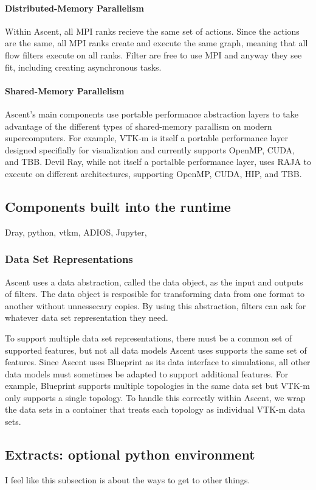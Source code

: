 \paragraph{Distributed-Memory Parallelism}
Within Ascent, all MPI ranks recieve the same set of actions.
%
Since the actions are the same, all MPI ranks create and execute the same graph,
meaning
that all flow filters execute on all ranks.
%
Filter are free to use MPI and anyway they see fit, including
creating asynchronous tasks.

\paragraph{Shared-Memory Parallelism}
Ascent's main components use portable performance abstraction layers to
take advantage of the different types of shared-memory parallism on
modern supercomputers.
%
For example, VTK-m is itself a portable performance layer designed specifially
for visualization and currently supports OpenMP, CUDA, and TBB.
%
Devil Ray, while not itself a portalble performance layer, uses RAJA to execute
on different architectures, supporting OpenMP, CUDA, HIP, and TBB.

\subsection{Components built into the runtime}
Dray, python, vtkm, ADIOS, Jupyter,

\subsubsection{Data Set Representations}
Ascent uses a data abstraction, called the data object, as the input
and outputs of filters.
%
The data object is resposible for transforming data from one format
to another without unnessecary copies.
%
By using this abstraction, filters can ask for whatever data set
representation they need.
%

To support multiple data set representations, there must be a common
set of supported features, but not all data models Ascent uses
supports the same set of features.
%
Since Ascent uses Blueprint as its data interface to simulations,
all other data models must sometimes be adapted to support additional
features.
%
For example, Blueprint supports multiple topologies in the same data set
but VTK-m only supports a single topology.
%
To handle this correctly within Ascent, we wrap the data sets in a container
that treats each topology as individual VTK-m data sets.
%

\subsection{Extracts: optional python environment}
I feel like this subsection is about the ways to get to other things.
